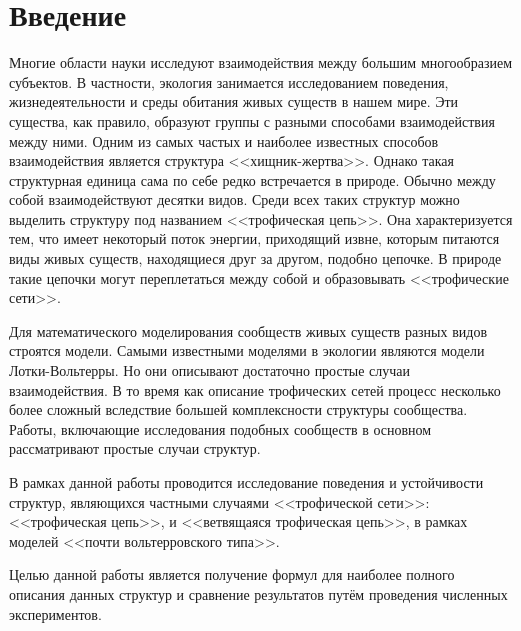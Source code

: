 \section{Введение}
Многие области науки исследуют взаимодействия между большим многообразием субъектов. В частности, экология занимается исследованием поведения, жизнедеятельности и среды обитания живых существ в нашем мире. Эти существа, как правило, образуют группы с разными способами взаимодействия между ними. Одним из самых частых и наиболее известных способов взаимодействия является структура <<хищник-жертва>>. Однако такая структурная единица сама по себе редко встречается в природе. Обычно между собой взаимодействуют десятки видов. Среди всех таких структур можно выделить структуру под названием <<трофическая цепь>>. Она характеризуется тем, что имеет некоторый поток энергии, приходящий извне, которым питаются виды живых существ, находящиеся друг за другом, подобно цепочке. В природе такие цепочки могут переплетаться между собой и образовывать <<трофические сети>>.

Для математического моделирования сообществ живых существ разных видов строятся модели. Самыми известными моделями в экологии являются модели Лотки-Вольтерры. Но они описывают достаточно простые случаи взаимодействия. В то время как описание трофических сетей процесс несколько более сложный вследствие большей комплексности структуры сообщества. Работы, включающие исследования подобных сообществ в основном рассматривают простые случаи структур. 

В рамках данной работы проводится исследование поведения и устойчивости структур, являющихся частными случаями <<трофической сети>>: <<трофическая цепь>>, и <<ветвящаяся трофическая цепь>>, в рамках моделей <<почти вольтерровского типа>>.

Целью данной работы является получение формул для наиболее полного описания данных структур и сравнение результатов путём проведения численных экспериментов.